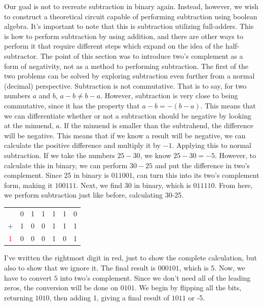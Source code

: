 \documentclass[oneside]{book}
\begin{document}
\tab
Our goal is not to recreate subtraction in binary again. Instead, however, we wish to construct a theoretical circuit capable of performing subtraction using boolean algebra. It's important to note that this is subtraction utilizing full-adders. This is how to perform subtraction by using addition, and there are other ways to perform it that require different steps which expand on the idea of the half-subtractor. The point of this section was to introduce two's complement as a form of negativity, not as a method to performing subtraction. The first of the two problems can be solved by exploring subtraction even further from a normal (decimal) perspective.
\newline
\tab
Subtraction is not commutative. That is to say, for two numbers $a$ and $b$, $a-b\neq b-a$. However, subtraction is very close to being commutative, since it has the property that $a-b=-(b-a)$. This means that we can differentiate whether or not a subtraction should be negative by looking at the minuend, $a$. If the minuend is smaller than the subtrahend, the difference will be negative. This means that if we know a result will be negative, we can calculate the positive difference and multiply it by $-1$. 
\newline
\tab
Applying this to normal subtraction. If we take the numbers $25-30$, we know $25-30=-5$. However, to calculate this in binary, we can perform $30-25$ and put the difference in two's complement. Since 25 in binary is $011001$, can turn this into its two's complement form, making it $100111$. Next, we find 30 in binary, which is $011110$. From here, we perform subtraction just like before, calculating 30-25.
\begin{center}
\begin{tabular}{c c c c c c c}
& 0 & 1 & 1 & 1 & 1 & 0\\
+ & 1 & 0 & 0 & 1 & 1 & 1 \\
\hline
\textcolor{red}{1} & 0 & 0 & 0 & 1 & 0 & 1
\end{tabular}
\end{center}
\tab
I've written the rightmost digit in red, just to show the complete calculation, but also to show that we ignore it. The final result is $000101$, which is 5. Now, we have to convert $5$ into two's complement. Since we don't need all of the leading zeros, the conversion will be done on $0101$. We begin by flipping all the bits, returning $1010$, then adding 1, giving a final result of $1011$ or -5. 
\end{document}
